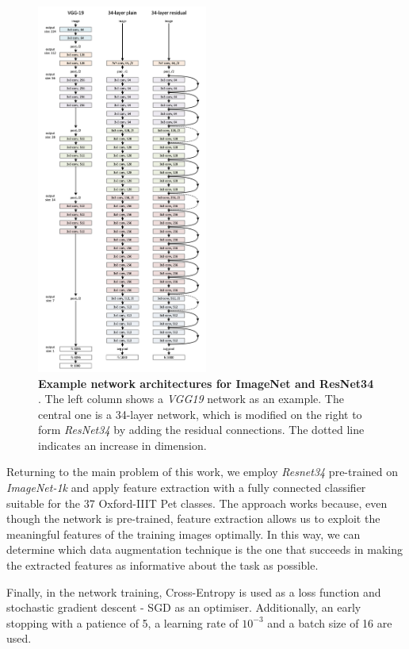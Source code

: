\begin{figure}
    \centering
    \includegraphics[width=0.5\textwidth]{Pictures/resnet34.png} 
    \caption{\textbf{Example network architectures for ImageNet and ResNet34} \cite{he2016deep}. The left column shows a \textit{VGG19} network as an example. The central one is a 34-layer network, which is modified on the right to form \textit{ResNet34} by adding the residual connections. The dotted line indicates an increase in dimension.}
    \label{fig:resnet34}
\end{figure}

Returning to the main problem of this work, we employ \textit{Resnet34} pre-trained on \textit{ImageNet-1k} and apply feature extraction with a fully connected classifier suitable for the 37 Oxford-IIIT Pet classes. The approach works because, even though the network is pre-trained, feature extraction allows us to exploit the meaningful features of the training images optimally. In this way, we can determine which data augmentation technique is the one that succeeds in making the extracted features as informative about the task as possible.

Finally, in the network training, Cross-Entropy is used as a loss function and stochastic gradient descent - SGD as an optimiser. Additionally, an early stopping with a patience of 5, a learning rate of $10^{-3}$ and a batch size of 16 are used.


